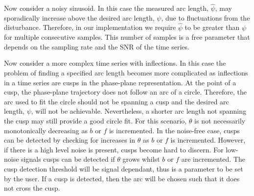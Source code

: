 \documentclass[a4paper]{IEEEtran}
\begin{document}
Now consider a noisy sinusoid. In this case the measured arc length, $\hat\psi$, may sporadically increase above the desired arc length, $\psi$, due to fluctuations from the disturbance. Therefore, in our implementation we require $\hat\psi$ to be greater than $\psi$ for multiple consecutive samples. This number of samples is a free parameter that depends on the sampling rate and the SNR of the time series. 

Now consider a more complex time series with inflections. In this case the problem of finding a specified arc length becomes more complicated as inflections in a time series are cusps in the phase-plane representation. At the point of a cusp, the phase-plane trajectory does not follow an arc of a circle. Therefore, the arc used to fit the circle should not be spanning a cusp and the desired arc length, $\psi$, will not be achievable. Nevertheless, a shorter arc length not spanning the cusp may still provide a good circle fit. For this scenario, $\theta$ is not necessarily monotonically decreasing as $b$ or $f$ is incremented. In the noise-free case, cusps can be detected by checking for increases in $\theta$ as $b$ or $f$ is incremented. However, if there is a high level noise is present, cusps become hard to discern. For low-noise signals cusps can be detected if $\theta$ grows whilst $b$ or $f$ are incremented. The cusp detection threshold will be signal dependant, thus is a  parameter to be set by the user. If a cusp is detected, then the arc will be chosen such that it does not cross the cusp.
 

 


\end{document}
